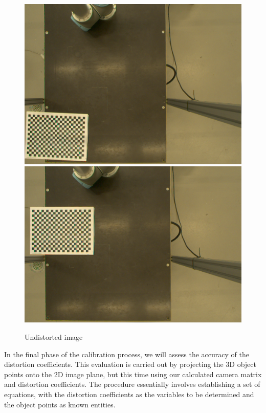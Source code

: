 \documentclass{article}
\begin{document}
\begin{figure}[h]
    \centering
    \includegraphics[scale=0.18]{Images/caliResult3.png}\qquad \includegraphics[scale=0.15]{Images/caliResult4.png}
    \caption{Undistorted image}
    \label{kk}
\end{figure}


In the final phase of the calibration process, we will assess the accuracy of the distortion coefficients. This evaluation is carried out by projecting the 3D object points onto the 2D image plane, but this time using our calculated camera matrix and distortion coefficients. The procedure essentially involves establishing a set of equations, with the distortion coefficients as the variables to be determined and the object points as known entities.
\end{document}
